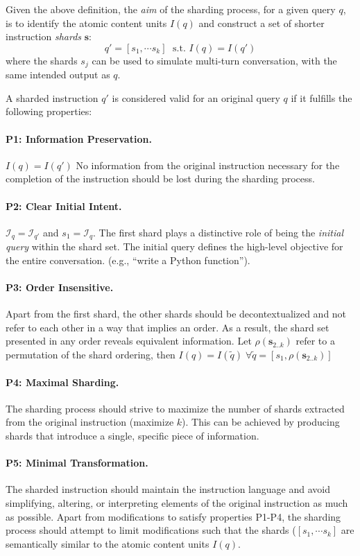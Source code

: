 \documentclass{article}
\newcommand{\shortp}[1]{\vspace{-1em}\paragraph{#1}}
\newcommand{\jn}[1]{}
\renewcommand{\jn}[1]{{\color{red} JN: {#1}}}
\newcommand{\hh}[1]{}
\renewcommand{\hh}[1]{{\color{blue} HH: {#1}}}
\begin{document}
\begin{appendices}
Given the above definition, the {\em aim} of the sharding process, for a given query $q$, is to identify the atomic content units $I(q)$ and construct a set of shorter instruction {\em shards} $\mathbf{s}$:
\[ q' = [s_1, \cdots s_k] \; \mbox{ s.t. } I(q)=I(q')\]
where the shards $s_j$ can be used to simulate multi-turn conversation, with the same intended output as $q$.

A sharded instruction $q'$ is considered valid for an original query $q$ if it fulfills the following properties:

\shortp{P1: Information Preservation.} $I(q)=I(q')$ No information from the original instruction necessary for the completion of the instruction should be lost during the sharding process.
\shortp{P2: Clear Initial Intent.} $\mathcal{I}_q=\mathcal{I}_{q'}$ and $s_1=\mathcal{I}_q$. The first shard plays a distinctive role of being the \textit{initial query} within the shard set. The initial query defines the high-level objective for the entire conversation. (e.g., ``write a Python function'').
\shortp{P3: Order Insensitive.} Apart from the first shard, the other shards should be decontextualized \cite{choi2021decontextualization} and not refer to each other in a way that implies an order. As a result, the shard set presented in any order reveals equivalent information. Let $\rho(\mathbf{s}_{2..k})$ refer to a permutation of the shard ordering, then $I(q)=I(\tilde{q}) \; \forall \tilde{q}=[s_1,\rho(\mathbf{s}_{2..k})]$
\shortp{P4: Maximal Sharding.} The sharding process should strive to maximize the number of shards extracted from the original instruction (maximize $k$). This can be achieved by producing shards that introduce a single, specific piece of information.
\shortp{P5: Minimal Transformation.} The sharded instruction should maintain the instruction language and avoid simplifying, altering, or interpreting elements of the original instruction as much as possible. Apart from modifications to satisfy properties P1-P4, the sharding process should attempt to limit modifications such that the shards ($[s_1, \cdots s_k]$ are semantically similar to the atomic content units $I(q)$.



\end{appendices}
\end{document}
